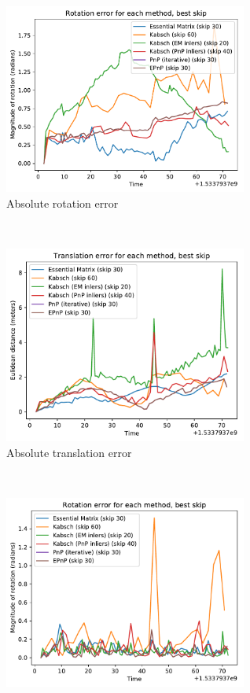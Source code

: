 \documentclass[12pt,a4paper]{article}
\begin{document}
    \begin{figure}[b!]
      \begin{subfigure}[t]{0.5\textwidth}
      \centering
        \includegraphics[width=80mm]{../quad/basic-reg-saves/methods/eR_best_a.pdf}
        \caption{Absolute rotation error}
      \end{subfigure} %
      ~
      \begin{subfigure}[t]{0.5\textwidth}
        \includegraphics[width=80mm]{../quad/basic-reg-saves/methods/et_best_a.pdf}
        \caption{Absolute translation error}
      \end{subfigure} \\
      \begin{subfigure}[t]{0.5\textwidth}
      \centering
        \includegraphics[width=80mm]{../quad/basic-reg-saves/methods/eR_best_r.pdf}

\end{subfigure}
\end{figure}
\end{document}
